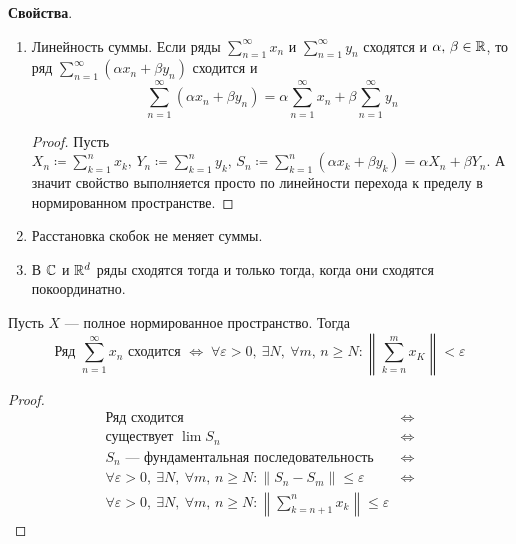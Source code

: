 \textbf{Свойства}.
\begin{enumerate}
  \item Линейность суммы. Если ряды $\sum\limits_{n = 1}^{\infty} x_n$ и $\sum\limits_{n = 1}^{\infty} y_n$ сходятся и $\alpha, \, \beta \in \mathbb{R}$, то ряд $\sum\limits_{n = 1}^{\infty}(\alpha x_n + \beta y_n)$ сходится и
  \begin{equation*}
    \sum\limits_{n = 1}^{\infty} (\alpha x_n + \beta y_n) = \alpha\sum\limits_{n = 1}^{\infty} x_n + \beta\sum\limits_{n = 1}^{\infty} y_n
  \end{equation*}
  \begin{proof}
    Пусть $X_n \coloneqq \sum\limits_{k = 1}^{n} x_k, \, Y_n \coloneqq \sum\limits_{k = 1}^{n} y_k, \, S_n \coloneqq \sum\limits_{k = 1}^{n}(\alpha x_k + \beta y_k) =
    \alpha X_n + \beta Y_n$. А значит свойство выполняется просто по линейности перехода к пределу в нормированном пространстве.
  \end{proof}

  \item Расстановка скобок не меняет суммы.

  \item В $\mathbb{C}$ и $\mathbb{R}^d$ ряды сходятся тогда и только тогда, когда они сходятся покоординатно.
\end{enumerate}

\begin{theorem}
  Пусть $X$ --- полное нормированное пространство. Тогда
  \begin{equation*}
    \text{Ряд }\sum\limits_{n = 1}^{\infty} x_n\text{ сходится }\iff \; \forall \varepsilon > 0, \: \exists N, \: \forall m,\, n \geq N\colon
    \left \|\sum\limits_{k = n}^{m} x_K \right \| < \varepsilon
  \end{equation*}
\end{theorem}
\begin{proof}
  \begin{align*}
    \text{Ряд сходится } &\iff \\
    \text{существует }\lim S_n &\iff \\
    S_n\text{ --- фундаментальная последовательность } &\iff \\
    \forall \varepsilon > 0, \: \exists N, \: \forall m, \, n \geq N\colon \|S_n - S_m\| \leq \varepsilon &\iff \\
    \forall \varepsilon > 0, \: \exists N, \: \forall m, \, n \geq N\colon
    \left\|\sum\limits_{k = n+ 1}^{n} x_k\right\| \leq \varepsilon&
  \end{align*}
\end{proof}

